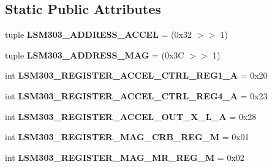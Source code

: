 \subsection*{Static Public Attributes}
\begin{DoxyCompactItemize}
\item 
\hypertarget{classdriver_1_1DRIVER__CORE_1_1Adafruit__LSM303_a24ad319884adc1c09dd29f423b8b6692}{}tuple {\bfseries L\+S\+M303\+\_\+\+A\+D\+D\+R\+E\+S\+S\+\_\+\+A\+C\+C\+E\+L} = (0x32 $>$$>$ 1)\label{classdriver_1_1DRIVER__CORE_1_1Adafruit__LSM303_a24ad319884adc1c09dd29f423b8b6692}

\item 
\hypertarget{classdriver_1_1DRIVER__CORE_1_1Adafruit__LSM303_a0b503ed9efa5d7a4d6edc9e02d1cd61f}{}tuple {\bfseries L\+S\+M303\+\_\+\+A\+D\+D\+R\+E\+S\+S\+\_\+\+M\+A\+G} = (0x3\+C $>$$>$ 1)\label{classdriver_1_1DRIVER__CORE_1_1Adafruit__LSM303_a0b503ed9efa5d7a4d6edc9e02d1cd61f}

\item 
\hypertarget{classdriver_1_1DRIVER__CORE_1_1Adafruit__LSM303_ac907d5dc53fef3f3a59a99e7dd969de2}{}int {\bfseries L\+S\+M303\+\_\+\+R\+E\+G\+I\+S\+T\+E\+R\+\_\+\+A\+C\+C\+E\+L\+\_\+\+C\+T\+R\+L\+\_\+\+R\+E\+G1\+\_\+\+A} = 0x20\label{classdriver_1_1DRIVER__CORE_1_1Adafruit__LSM303_ac907d5dc53fef3f3a59a99e7dd969de2}

\item 
\hypertarget{classdriver_1_1DRIVER__CORE_1_1Adafruit__LSM303_ab9fecee305847de9273f660412fccf01}{}int {\bfseries L\+S\+M303\+\_\+\+R\+E\+G\+I\+S\+T\+E\+R\+\_\+\+A\+C\+C\+E\+L\+\_\+\+C\+T\+R\+L\+\_\+\+R\+E\+G4\+\_\+\+A} = 0x23\label{classdriver_1_1DRIVER__CORE_1_1Adafruit__LSM303_ab9fecee305847de9273f660412fccf01}

\item 
\hypertarget{classdriver_1_1DRIVER__CORE_1_1Adafruit__LSM303_a9db7d714f9448a3ac4121457f1996634}{}int {\bfseries L\+S\+M303\+\_\+\+R\+E\+G\+I\+S\+T\+E\+R\+\_\+\+A\+C\+C\+E\+L\+\_\+\+O\+U\+T\+\_\+\+X\+\_\+\+L\+\_\+\+A} = 0x28\label{classdriver_1_1DRIVER__CORE_1_1Adafruit__LSM303_a9db7d714f9448a3ac4121457f1996634}

\item 
\hypertarget{classdriver_1_1DRIVER__CORE_1_1Adafruit__LSM303_a9ce34b06b2a881fe87f4acf7275e788d}{}int {\bfseries L\+S\+M303\+\_\+\+R\+E\+G\+I\+S\+T\+E\+R\+\_\+\+M\+A\+G\+\_\+\+C\+R\+B\+\_\+\+R\+E\+G\+\_\+\+M} = 0x01\label{classdriver_1_1DRIVER__CORE_1_1Adafruit__LSM303_a9ce34b06b2a881fe87f4acf7275e788d}

\item 
\hypertarget{classdriver_1_1DRIVER__CORE_1_1Adafruit__LSM303_af17a9acb25451a4a2c5f388ff6f95754}{}int {\bfseries L\+S\+M303\+\_\+\+R\+E\+G\+I\+S\+T\+E\+R\+\_\+\+M\+A\+G\+\_\+\+M\+R\+\_\+\+R\+E\+G\+\_\+\+M} = 0x02\label{classdriver_1_1DRIVER__CORE_1_1Adafruit__LSM303_af17a9acb25451a4a2c5f388ff6f95754}


\end{DoxyCompactItemize}
